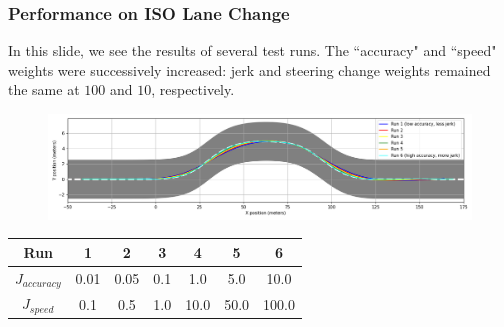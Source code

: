 \documentclass{beamer}
\begin{document}
\begin{frame}
\frametitle{Performance on ISO Lane Change}

In this slide, we see the results of several test runs. The ``accuracy" and ``speed" weights were successively increased: jerk and steering change weights remained the same at $100$ and $10$, respectively.

\vspace{-0.5em}
\begin{figure}
	\centering
	\includegraphics[width=1.0\linewidth]{figures/road_paths.png}
\end{figure}
\vspace{-0.5em}

\begin{table}
	\begin{tabular}{c|cccccc}
Run & 1 & 2 & 3 & 4 & 5 & 6
\\\hline
 $J_{accuracy}$ & 0.01 & 0.05 & 0.1 & 1.0 & 5.0 & 10.0
\\
 $J_{speed}$ & 0.1 & 0.5 & 1.0 & 10.0 & 50.0 & 100.0
\end{tabular}
\end{table}

\end{frame}
\end{document}
